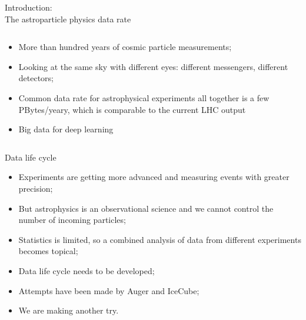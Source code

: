 \begin{frame}{Introduction: \\The astroparticle physics data rate}
\begin{columns}
\begin{column}[t]{0.53\textwidth}
    \begin{itemize}
    \item More than hundred years of cosmic particle measurements;
    \item Looking at the same sky with different eyes: different messengers, different detectors;
    \item Common data rate for astrophysical experiments all together is a few PBytes/yeary, which is comparable to the current LHC output\footnotemark[1] %
    \item Big data for deep learning
    \end{itemize}

  \end{column}
\end{columns}
  \footnotesize{}
\end{frame}

\begin{frame}{Data life cycle}
\begin{itemize}
\item Experiments are getting more advanced and measuring events with greater precision;
\item But astrophysics is an observational science and we cannot control the number of incoming particles;
\item Statistics is limited, so a combined analysis of data from different experiments becomes topical;
\item Data life cycle needs to be developed;
\item Attempts have been made by Auger and IceCube;
\item We are making another try.
\end{itemize}
\end{frame}

